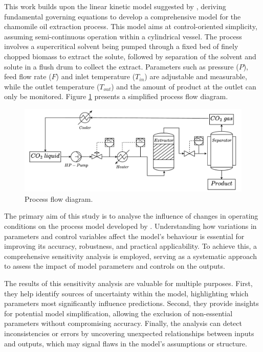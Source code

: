 \documentclass[a4paper,fleqn]{cas-dc}
\begin{document}
	This work builds upon the linear kinetic model suggested by \citet{Reverchon1996}, deriving fundamental governing equations to develop a comprehensive model for the chamomile oil extraction process. This model aims at control-oriented simplicity, assuming semi-continuous operation within a cylindrical vessel. The process involves a supercritical solvent being pumped through a fixed bed of finely chopped biomass to extract the solute, followed by separation of the solvent and solute in a flush drum to collect the extract. Parameters such as pressure ($P$), feed flow rate ($F$) and inlet temperature ($T_{in}$) are adjustable and measurable, while the outlet temperature ($T_{out}$) and the amount of product at the outlet can only be monitored. Figure \ref{fig: SFE_drawing} presents a simplified process flow diagram.
	
	\begin{figure}[h!]
		\centering
		\includegraphics[width=\columnwidth]{Figures/PFD.drawio.pdf}
		\caption{Process flow diagram.}
		\label{fig: SFE_drawing}
	\end{figure}
	
	{\color{blue}The primary aim of this study is to analyse the influence of changes in operating conditions on the process model developed by \citet{Sliczniuk2024}. Understanding how variations in parameters and control variables affect the model's behaviour is essential for improving its accuracy, robustness, and practical applicability. To achieve this, a comprehensive sensitivity analysis is employed, serving as a systematic approach to assess the impact of model parameters and controls on the outputs.
	
	The results of this sensitivity analysis are valuable for multiple purposes. First, they help identify sources of uncertainty within the model, highlighting which parameters most significantly influence predictions. Second, they provide insights for potential model simplification, allowing the exclusion of non-essential parameters without compromising accuracy. Finally, the analysis can detect inconsistencies or errors by uncovering unexpected relationships between inputs and outputs, which may signal flaws in the model's assumptions or structure. }
	
\end{document}
